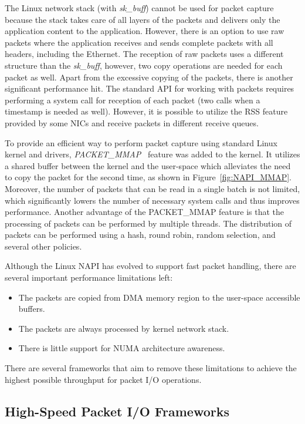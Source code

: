 The Linux network stack (with \emph{sk\_buff}) cannot be used for packet capture because the stack takes care of all layers of the packets and delivers only the application content to the application. However, there is an option to use raw packets where the application receives and sends complete packets with all headers, including the Ethernet. The reception of raw packets uses a different structure than the \emph{sk\_buff}, however, two copy operations are needed for each packet as well. Apart from the excessive copying of the packets, there is another significant performance hit. The standard API for working with packets requires performing a system call for reception of each packet (two calls when a timestamp is needed as well). However, it is possible to utilize the RSS feature provided by some NICs and receive packets in different receive queues.

To provide an efficient way to perform packet capture using standard Linux kernel and drivers, \emph{PACKET\_MMAP}~\cite{LinuxKernelOrganization-2017-PACKETMMAP} feature was added to the kernel. It utilizes a shared buffer between the kernel and the user-space which alleviates the need to copy the packet for the second time, as shown in Figure~\ref{fig:NAPI_MMAP}. Moreover, the number of packets that can be read in a single batch is not limited, which significantly lowers the number of necessary system calls and thus improves performance. Another advantage of the PACKET\_MMAP feature is that the processing of packets can be performed by multiple threads. The distribution of packets can be performed using a hash, round robin, random selection, and several other policies. 

Although the Linux NAPI has evolved to support fast packet handling, there are several important performance limitations left:
\begin{itemize}
  \item The packets are copied from DMA memory region to the user-space accessible buffers.
  \item The packets are always processed by kernel network stack.
  \item There is little support for NUMA architecture awareness.
\end{itemize}

There are several frameworks that aim to remove these limitations to achieve the highest possible throughput for packet I/O operations.


\subsection{High-Speed Packet I/O Frameworks}

